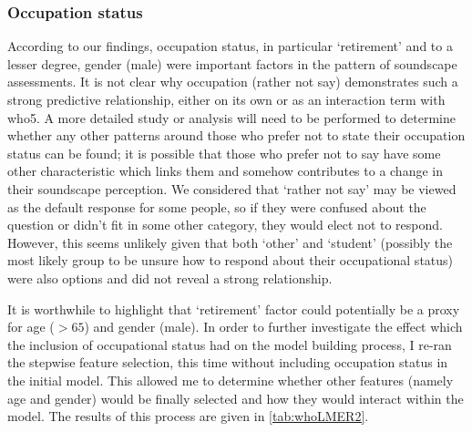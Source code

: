 \subsubsection*{Occupation status}
According to our findings, occupation status, in particular `retirement' and to a lesser degree, gender (male) were important factors in the pattern of soundscape assessments. It is not clear why occupation (rather not say) demonstrates such a strong predictive relationship, either on its own or as an interaction term with \gls{who5}. A more detailed study or analysis will need to be performed to determine whether any other patterns around those who prefer not to state their occupation status can be found; it is possible that those who prefer not to say have some other characteristic which links them and somehow contributes to a change in their soundscape perception. We considered that `rather not say' may be viewed as the default response for some people, so if they were confused about the question or didn't fit in some other category, they would elect not to respond. However, this seems unlikely given that both `other' and `student' (possibly the most likely group to be unsure how to respond about their occupational status) were also options and did not reveal a strong relationship.

It is worthwhile to highlight that `retirement' factor could potentially be a proxy for age ($>65$) and gender (male). In order to further investigate the effect which the inclusion of occupational status had on the model building process, I re-ran the stepwise feature selection, this time without including occupation status in the initial model. This allowed me to determine whether other features (namely age and gender) would be finally selected and how they would interact within the model. The results of this process are given in \cref{tab:whoLMER2}.

